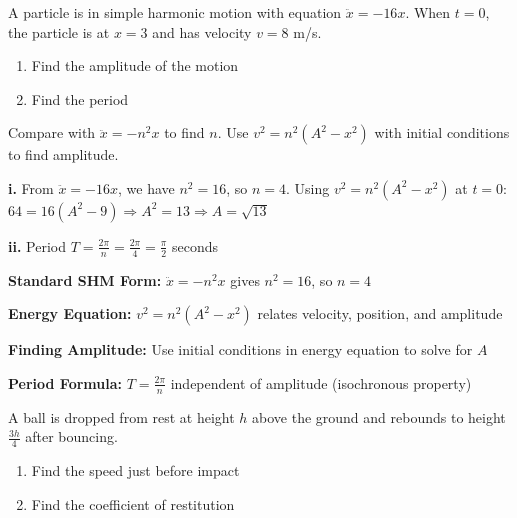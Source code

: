 \begin{problem}
A particle is in simple harmonic motion with equation $\ddot{x} = -16x$. When $t = 0$, the particle is at $x = 3$ and has velocity $v = 8$ m/s.

\begin{enumerate}[label=\textbf{\roman*.}]
    \item Find the amplitude of the motion
    \item Find the period
\end{enumerate}
\end{problem}

\begin{hint}
Compare with $\ddot{x} = -n^2x$ to find $n$. Use $v^2 = n^2(A^2 - x^2)$ with initial conditions to find amplitude.
\end{hint}

\begin{solution}
\textbf{i.} From $\ddot{x} = -16x$, we have $n^2 = 16$, so $n = 4$. Using $v^2 = n^2(A^2 - x^2)$ at $t=0$: $64 = 16(A^2 - 9) \Rightarrow A^2 = 13 \Rightarrow A = \sqrt{13}$

\textbf{ii.} Period $T = \frac{2\pi}{n} = \frac{2\pi}{4} = \frac{\pi}{2}$ seconds
\end{solution}

\begin{takeaways}
\item \textbf{Standard SHM Form:} $\ddot{x} = -n^2x$ gives $n^2 = 16$, so $n = 4$
\item \textbf{Energy Equation:} $v^2 = n^2(A^2 - x^2)$ relates velocity, position, and amplitude
\item \textbf{Finding Amplitude:} Use initial conditions in energy equation to solve for $A$
\item \textbf{Period Formula:} $T = \frac{2\pi}{n}$ independent of amplitude (isochronous property)
\end{takeaways}

\begin{problem}
A ball is dropped from rest at height $h$ above the ground and rebounds to height $\frac{3h}{4}$ after bouncing.

\begin{enumerate}[label=\textbf{\roman*.}]
    \item Find the speed just before impact
    \item Find the coefficient of restitution
\end{enumerate}
\end{problem}

